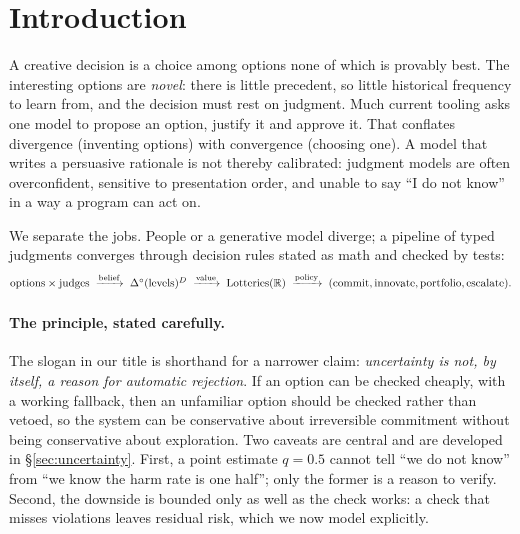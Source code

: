 \documentclass[11pt]{article}
\theoremstyle{definition}
\begin{document}
\tableofcontents
\newpage

\section{Introduction}

A creative decision is a choice among options none of which is provably best. The interesting
options are \emph{novel}: there is little precedent, so little historical frequency to learn from,
and the decision must rest on judgment. Much current tooling asks one model to propose an option,
justify it and approve it. That conflates divergence (inventing options) with convergence
(choosing one). A model that writes a persuasive rationale is not thereby calibrated: judgment
models are often overconfident, sensitive to presentation order, and unable to say ``I do not
know'' in a way a program can act on.

We separate the jobs. People or a generative model diverge; a pipeline of typed judgments
converges through decision rules stated as math and checked by tests:
\begin{equation*}
\scalebox{0.92}{$\text{options} \times \text{judges}
\;\xrightarrow{\text{belief}}\;
\Delta^\circ(\text{levels})^{D}
\;\xrightarrow{\text{value}}\;
\mathrm{Lotteries}(\mathbb{R})
\;\xrightarrow{\text{policy}}\;
(\text{commit}, \text{innovate}, \text{portfolio}, \text{escalate}).$}
\end{equation*}

\paragraph{The principle, stated carefully.} The slogan in our title is shorthand for a narrower
claim: \emph{uncertainty is not, by itself, a reason for automatic rejection}. If an option can be
checked cheaply, with a working fallback, then an unfamiliar option should be checked rather than
vetoed, so the system can be conservative about irreversible commitment without being
conservative about exploration. Two caveats are central and are developed in
\S\ref{sec:uncertainty}. First, a point estimate $q=0.5$ cannot tell ``we do not know'' from ``we
know the harm rate is one half''; only the former is a reason to verify. Second, the downside is
bounded only as well as the check works: a check that misses violations leaves residual risk,
which we now model explicitly.
\end{document}
